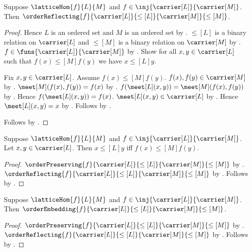 \begin{theorem}\label{injective_lattice_hom_order_reflecting}
    Suppose $\latticeHom{f}{L}{M}$ and
        $f\in\inj{\carrier[L]}{\carrier[M]}$.
    Then
        $\orderReflecting
            {f}{\carrier[L]}{\leq[L]}{\carrier[M]}{\leq[M]}$.
\end{theorem}
\begin{proof}
    Hence $L$ is an ordered set and $M$ is an ordered set by
        .
    $\leq[L]$ is a binary relation on $\carrier[L]$ and
        $\leq[M]$ is a binary relation on $\carrier[M]$ by
        .
    $f\in\funs{\carrier[L]}{\carrier[M]}$ by .
    Show for all $x,y\in\carrier[L]$ such that
        $f(x)\mathrel{\leq[M]}f(y)$ we have
        $x\mathrel{\leq[L]}y$.
    \begin{subproof}
        Fix $x,y\in\carrier[L]$.
        Assume $f(x)\mathrel{\leq[M]}f(y)$.
        $f(x),f(y)\in\carrier[M]$ by
            .
        $\meet[M](f(x),f(y))=f(x)$ by
            .
        $f(\meet[L](x,y))=\meet[M](f(x),f(y))$ by
            .
        Hence $f(\meet[L](x,y))=f(x)$.
        $\meet[L](x,y)\in\carrier[L]$ by
            .
        Hence $\meet[L](x,y)=x$ by .
        Follows by
            .
    \end{subproof}
    Follows by .
\end{proof}

\begin{proposition}\label{injective_lattice_hom_order_iff}
    Suppose $\latticeHom{f}{L}{M}$ and
        $f\in\inj{\carrier[L]}{\carrier[M]}$.
    Let $x,y\in\carrier[L]$.
    Then $x\mathrel{\leq[L]}y$ iff
        $f(x)\mathrel{\leq[M]}f(y)$.
\end{proposition}
\begin{proof}
    $\orderPreserving
        {f}{\carrier[L]}{\leq[L]}{\carrier[M]}{\leq[M]}$ by
        .
    $\orderReflecting
        {f}{\carrier[L]}{\leq[L]}{\carrier[M]}{\leq[M]}$ by
        .
    Follows by .
\end{proof}

\begin{theorem}\label{injective_lattice_hom_order_embedding}
    Suppose $\latticeHom{f}{L}{M}$ and
        $f\in\inj{\carrier[L]}{\carrier[M]}$.
    Then
        $\orderEmbedding
            {f}{\carrier[L]}{\leq[L]}{\carrier[M]}{\leq[M]}$.
\end{theorem}
\begin{proof}
    $\orderPreserving
        {f}{\carrier[L]}{\leq[L]}{\carrier[M]}{\leq[M]}$ by
        .
    $\orderReflecting
        {f}{\carrier[L]}{\leq[L]}{\carrier[M]}{\leq[M]}$ by
        .
    Follows by .
\end{proof}

